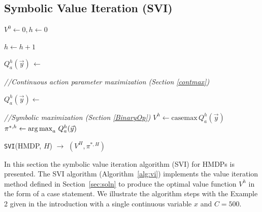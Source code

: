 \documentclass[twoside,11pt]{article}
\def\argmax{\operatornamewithlimits{arg\max}}
\newcommand{\casemax}{\mathrm{casemax}}
\begin{document}
\subsection{Symbolic Value Iteration (SVI)}
\label{section:SVI}
\incmargin{.5em}
\linesnumbered
\begin{algorithm}[t!]
\dontprintsemicolon
{}
\Begin
{
   $V^0 \leftarrow 0, h\leftarrow 0$\;
   {
       $h\leftarrow h+1$\;
       {
              $Q_a^{h}(\vec{y})\,\leftarrow \,$\;
               {       			  \emph{//Continuous action parameter maximization (Section \ref{contmax})}\;

               $Q_a^{h}(\vec{y}) \leftarrow$  \;
               } 
           }
        \emph{//Symbolic maximization (Section \ref{BinaryOp})}\;
       $V^{h} \leftarrow \casemax \, Q_a^{h}(\vec{y})$ $\,$ \;
        $\pi^{*,h} \leftarrow \argmax_{a} \, Q_a^{h}(\vec{y})$ \; 
   }
      \;
}
\caption{\footnotesize \texttt{SVI}(HMDP, $H$) $\longrightarrow$ $(V^H,\pi^{*,H})$ \label{alg:vi}}
\end{algorithm}
\decmargin{.5em}
In this section the symbolic value iteration algorithm (SVI) for HMDPs is presented. The SVI algorithm (Algorithm~\ref{alg:vi}) implements the value
iteration method defined in Section~\ref{sec:soln} to produce the
optimal value function $V^h$ in the form
of a case statement. We illustrate the algorithm steps with the Example 2 given in the introduction with a single continuous variable $x$ and $C=500$.
\end{document}
